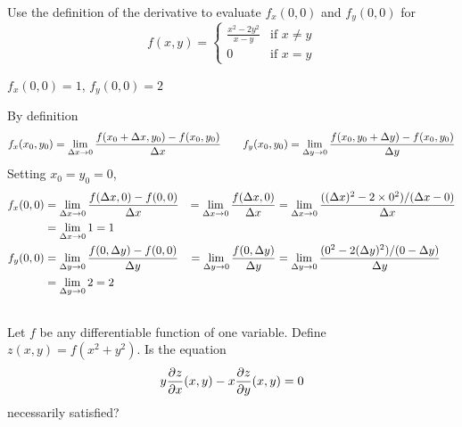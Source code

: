 \begin{question}
Use the definition of the derivative to evaluate $f_x(0,0)$ and $f_y(0,0)$ for
\begin{equation*}
f(x,y)=\begin{cases}
                \frac{x^2-2y^2}{x-y}&\text{if $x\ne y$}\\ 
                0&\text{if $x=y$} \end{cases}
\end{equation*}
\end{question}

%

\begin{answer}
$f_x(0,0)=1$,\qquad
$f_y(0,0)=2$
\end{answer}

\begin{solution}
By definition
\begin{equation*}
f_x(x_0,y_0)=\lim_{\Delta x\rightarrow 0}\frac{f(x_0+\Delta x,y_0)-f(x_0,y_0)}{\Delta x}
\qquad
f_y(x_0,y_0)=\lim_{\Delta y\rightarrow 0}\frac{f(x_0,y_0+\Delta y)-f(x_0,y_0)}{\Delta y}
\end{equation*}
Setting $x_0=y_0=0$,
\begin{alignat*}{5}
f_x(0,0)&=\lim_{\Delta x\rightarrow 0}\frac{f(\Delta x,0)-f(0,0)}{\Delta x}
&=\lim_{\Delta x\rightarrow 0}\frac{f(\Delta x,0)}{\Delta x}
&=\lim_{\Delta x\rightarrow 0}\frac{((\Delta x)^2-2\times0^2)/(\Delta x-0)}{\Delta x} \\
&=\lim_{\Delta x\rightarrow 0}1
=1\\
f_y(0,0)&=\lim_{\Delta y\rightarrow 0}\frac{f(0,\Delta y)-f(0,0)}{\Delta y}
&=\lim_{\Delta y\rightarrow 0}\frac{f(0,\Delta y)}{\Delta y}
&=\lim_{\Delta y\rightarrow 0}\frac{(0^2-2(\Delta y)^2)/(0-\Delta y)}{\Delta y} \\
&=\lim_{\Delta y\rightarrow 0}2
=2
\end{alignat*}

\end{solution}


\subsection*{\Application}

\begin{question}
Let $f$ be any differentiable function of one variable. Define 
$z(x,y)=f(x^2+y^2)$. Is the equation 
\begin{equation*}
y\pdiff{z}{x}(x,y)-x\pdiff{z}{y}(x,y) = 0
\end{equation*}
necessarily satisfied? 
\end{question}

